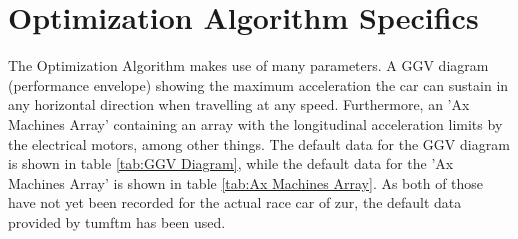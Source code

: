 \section{Optimization Algorithm Specifics}
The Optimization Algorithm makes use of many parameters. A GGV diagram (performance envelope) showing the maximum acceleration the car can sustain in any horizontal direction when travelling at any speed. Furthermore, an 'Ax Machines Array' containing an array with the longitudinal acceleration limits by the electrical motors, among other things. The default data for the GGV diagram is shown in table \ref{tab:GGV Diagram}, while the default data for the 'Ax Machines Array' is shown in table \ref{tab:Ax Machines Array}. As both of those have not yet been recorded for the actual race car of \acrshort{zur}, the default data provided by \acrshort{tumftm} has been used.

